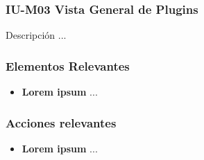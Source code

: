 
\subsubsection{IU-M03 Vista General de Plugins}

 Descripción ...


\subsubsection{Elementos Relevantes}

    \begin{itemize}
    \item {\bf Lorem ipsum}
        ...
    \end{itemize}

\subsubsection{Acciones relevantes}

    \begin{itemize}
    \item {\bf Lorem ipsum}
        ...
    \end{itemize}

\clearpage
